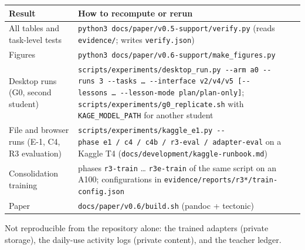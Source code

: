 \documentclass[
  10pt,
]{article}
\newcounter{none} %
\begin{document}
{\def\LTcaptype{none} %
\begin{longtable}[]{@{}
  >{\raggedright\arraybackslash}p{}
  >{\raggedright\arraybackslash}p{}@{}}
\toprule\noalign{}
\begin{minipage}[b]{\linewidth}\raggedright
Result
\end{minipage} & \begin{minipage}[b]{\linewidth}\raggedright
How to recompute or rerun
\end{minipage} \\
\midrule\noalign{}
\endhead
\bottomrule\noalign{}
\endlastfoot
All tables and task-level tests &
\texttt{python3\ docs/paper/v0.5-support/verify.py} (reads
\texttt{evidence/}; writes \texttt{verify.json}) \\
Figures & \texttt{python3\ docs/paper/v0.6-support/make\_figures.py} \\
Desktop runs (G0, second student) &
\texttt{scripts/experiments/desktop\_run.py\ -\/-arm\ a0\ -\/-runs\ 3\ -\/-tasks\ …\ -\/-interface\ v2/v4/v5\ {[}-\/-lessons\ …\ -\/-lesson-mode\ plan/plan-only{]}};
\texttt{scripts/experiments/g0\_replicate.sh} with
\texttt{KAGE\_MODEL\_PATH} for another student \\
File and browser runs (E-1, C4, R3 evaluation) &
\texttt{scripts/experiments/kaggle\_e1.py\ -\/-phase\ e1\ /\ c4\ /\ c4b\ /\ r3-eval\ /\ adapter-eval}
on a Kaggle T4 (\texttt{docs/development/kaggle-runbook.md}) \\
Consolidation training & phases \texttt{r3-train} \ldots{}
\texttt{r3e-train} of the same script on an A100; configurations in
\texttt{evidence/reports/r3*/train-config.json} \\
Paper & \texttt{docs/paper/v0.6/build.sh} (pandoc + tectonic) \\
\end{longtable}
}

Not reproducible from the repository alone: the trained adapters
(private storage), the daily-use activity logs (private content), and
the teacher ledger.
\end{document}
